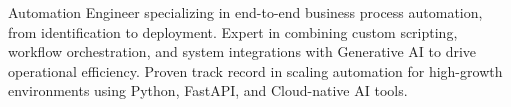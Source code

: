 \begin{cvparagraph}
  Automation Engineer specializing in end-to-end business process automation, from identification to deployment. Expert in combining custom scripting, workflow orchestration, and system integrations with Generative AI to drive operational efficiency. Proven track record in scaling automation for high-growth environments using Python, FastAPI, and Cloud-native AI tools.
\end{cvparagraph}